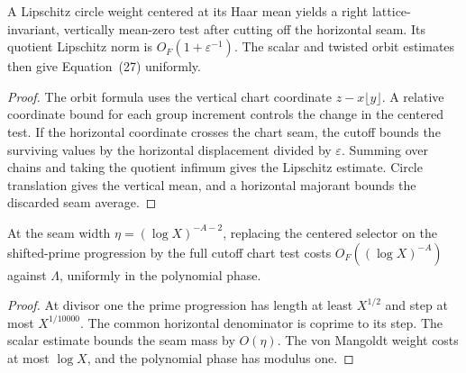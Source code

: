 \begin{lemma}\label{checked-centered}
\leanok
A Lipschitz circle weight centered at its Haar mean yields a
right lattice-invariant, vertically mean-zero test after cutting off
the horizontal seam. Its quotient Lipschitz norm is
$O_F(1+\varepsilon^{-1})$. The scalar and twisted orbit estimates
then give Equation~(27) uniformly.
\end{lemma}
\begin{proof}
\leanok
The orbit formula uses the vertical chart coordinate
$z-x\lfloor y\rfloor$. A relative coordinate bound for each group
increment controls the change in the centered test. If the horizontal
coordinate crosses the chart seam, the cutoff bounds the surviving
values by the horizontal displacement divided by $\varepsilon$.
Summing over chains and taking the quotient infimum gives the
Lipschitz estimate. Circle translation gives the vertical mean, and a
horizontal majorant bounds the discarded seam average.
\end{proof}

\begin{lemma}\label{checked-prime-seam}
\leanok
At the seam width $\eta=(\log X)^{-A-2}$, replacing the centered
selector on the shifted-prime progression by the full cutoff chart
test costs $O_F((\log X)^{-A})$ against $\Lambda$, uniformly in the
polynomial phase.
\end{lemma}
\begin{proof}
\leanok
At divisor one the prime progression has length at least $X^{1/2}$
and step at most $X^{1/10000}$. The common horizontal denominator
is coprime to its step. The scalar estimate bounds the seam mass
by $O(\eta)$. The von Mangoldt weight costs at most $\log X$, and the
polynomial phase has modulus one.
\end{proof}

